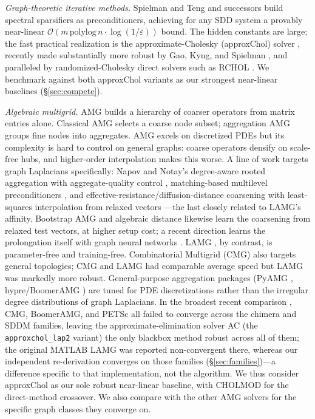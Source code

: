 \documentclass[review]{siamart220329}
\begin{document}
\emph{Graph-theoretic iterative methods.} Spielman and Teng \cite{spielman-teng} and
successors \cite{kelner-stoc} build spectral sparsifiers as preconditioners, achieving
for any SDD system a provably near-linear $\mathcal{O}(m\,\mathrm{polylog}\,n\cdot\log(1/\varepsilon))$ bound. The hidden constants are large; the fast practical realization is the
approximate-Cholesky (approxChol) solver \cite{kelner-stoc,laplacians}, recently made
substantially more robust by Gao, Kyng, and Spielman \cite{gks2023}, and paralleled by randomized-Cholesky direct
solvers such as RCHOL \cite{rchol}. We benchmark against both approxChol variants as
our strongest near-linear baselines (\S\ref{sec:compete}).

\emph{Algebraic multigrid.} AMG \cite{brandt-amg,ruge-stuben} builds a hierarchy of coarser
operators from matrix entries alone. Classical AMG selects a coarse node subset; aggregation
AMG \cite{vanek-mandel-brezina,notay} groups fine nodes into aggregates. AMG excels on
discretized PDEs but its complexity is hard to control on general graphs: coarse operators
densify on scale-free hubs, and higher-order interpolation makes this worse. A line of work
targets graph Laplacians specifically: Napov and Notay's degree-aware rooted aggregation with
aggregate-quality control \cite{napov-notay}, matching-based multilevel preconditioners
\cite{brannick-match}, and effective-resistance/diffusion-distance coarsening with
least-squares interpolation from relaxed vectors \cite{lee2024}---the last closely related to
LAMG's affinity. Bootstrap AMG \cite{brandt-bootstrap} and algebraic distance
\cite{ron-safro-brandt} likewise learn the coarsening from relaxed test vectors, at higher setup
cost; a recent direction learns the prolongation itself with graph neural networks
\cite{learned-amg}. LAMG \cite{lamg}, by contrast, is parameter-free and training-free. Combinatorial
Multigrid (CMG) \cite{cmg} also targets general topologies; CMG and LAMG had comparable average
speed but LAMG was markedly more robust. General-purpose aggregation packages
(PyAMG \cite{pyamg}, hypre/BoomerAMG \cite{boomeramg}) are tuned for PDE discretizations rather
than the irregular degree distributions of graph Laplacians. In the broadest recent comparison
\cite{gks2023}, CMG, BoomerAMG, and PETSc all failed to converge across the chimera and SDDM
families, leaving the approximate-elimination solver AC (the \texttt{approxchol\_lap2} variant)
the only blackbox method robust across all of them; the original MATLAB LAMG was reported
non-convergent there, whereas our independent re-derivation converges on those families
(\S\ref{sec:families})---a difference specific to that implementation, not the algorithm. We thus consider
approxChol as our sole robust near-linear baseline, with CHOLMOD for the
direct-method crossover. We also compare with the other AMG solvers for the specific graph classes they converge on.
\end{document}
